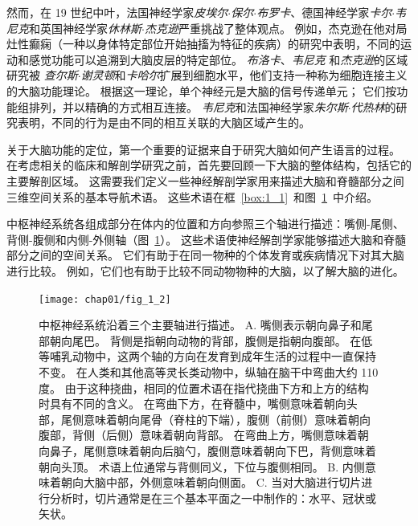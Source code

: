 然而，在 19 世纪中叶，法国神经学家\textit{皮埃尔$\cdot$保尔$\cdot$布罗卡}、德国神经学家\textit{卡尔$\cdot$韦尼克}和英国神经学家\textit{休林斯$\cdot$杰克逊}严重挑战了整体观点。
例如，杰克逊在他对局灶性癫痫（一种以身体特定部位开始抽搐为特征的疾病）的研究中表明，不同的运动和感觉功能可以追溯到大脑皮层的特定部位。
\textit{布洛卡}、\textit{韦尼克} 和\textit{杰克逊}的区域研究被 \textit{查尔斯$\cdot$谢灵顿}和\textit{卡哈尔}扩展到细胞水平，他们支持一种称为细胞连接主义的大脑功能理论。
根据这一理论，单个神经元是大脑的信号传递单元；
它们按功能组排列，并以精确的方式相互连接。
\textit{韦尼克}和法国神经学家\textit{朱尔斯$\cdot$代热林}的研究表明，不同的行为是由不同的相互关联的大脑区域产生的。


关于大脑功能的定位，第一个重要的证据来自于研究大脑如何产生语言的过程。
在考虑相关的临床和解剖学研究之前，首先要回顾一下大脑的整体结构，包括它的主要解剖区域。
这需要我们定义一些神经解剖学家用来描述大脑和脊髓部分之间三维空间关系的基本导航术语。
这些术语在框~\ref{box:1_1}~和图~\ref{fig:1_2}~中介绍。


\begin{proposition}[神经解剖学导航术语] \label{box:1_1}
	
	\quad \quad 中枢神经系统各组成部分在体内的位置和方向参照三个轴进行描述：嘴侧-尾侧、背侧-腹侧和内侧-外侧轴（图~\ref{fig:1_2}）。
	这些术语使神经解剖学家能够描述大脑和脊髓部分之间的空间关系。
	它们有助于在同一物种的个体发育或疾病情况下对其大脑进行比较。
	例如，它们也有助于比较不同动物物种的大脑，以了解大脑的进化。

\end{proposition}


\begin{figure}[htbp]
	\centering
	\texttt{[image: chap01/fig\_1\_2]}
	\caption{中枢神经系统沿着三个主要轴进行描述\cite{martin2012neuroanatomy}。 
		A. 嘴侧表示朝向鼻子和尾部朝向尾巴。
		背侧是指朝向动物的背部，腹侧是指朝向腹部。
		在低等哺乳动物中，这两个轴的方向在发育到成年生活的过程中一直保持不变。
		在人类和其他高等灵长类动物中，纵轴在脑干中弯曲大约 110 度。
		由于这种挠曲，相同的位置术语在指代挠曲下方和上方的结构时具有不同的含义。
		在弯曲下方，在脊髓中，嘴侧意味着朝向头部，尾侧意味着朝向尾骨（脊柱的下端），腹侧（前侧）意味着朝向腹部，背侧（后侧）意味着朝向背部。
		在弯曲上方，嘴侧意味着朝向鼻子，尾侧意味着朝向后脑勺，腹侧意味着朝向下巴，背侧意味着朝向头顶。
		术语上位通常与背侧同义，下位与腹侧相同。
		B. 内侧意味着朝向大脑中部，外侧意味着朝向侧面。
		C. 当对大脑进行切片进行分析时，切片通常是在三个基本平面之一中制作的：水平、冠状或矢状。}
	\label{fig:1_2}
\end{figure}



